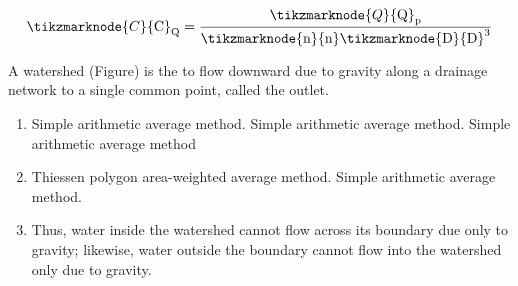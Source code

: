 \bigskip

\begin{equation}
\label{ch05:eqn5.9}
\tikzmarknode{C}{\mathrm{C}}_\mathrm{Q} = \frac{\tikzmarknode{Q}{\mathrm{Q}}_\mathrm{p}}{\mathrm{\tikzmarknode{n}{\mathrm{n}}\tikzmarknode{D}{D}}^3}
\end{equation}

\bigskip\smallskip

A watershed (Figure) is the to flow downward due to gravity along a drainage network
to a single common point, called the outlet.

\begin{enumerate}[(3)]
\item[(1)] Simple arithmetic average method. Simple arithmetic average method. Simple arithmetic average method

\item[(2)] Thiessen polygon area-weighted average method. Simple arithmetic average method.

\item[(3)] Thus, water inside the watershed cannot flow across its boundary due only to gravity; likewise, water outside the boundary cannot flow into the
watershed only due to gravity.
\end{enumerate}

\lipsum[5]



\lipsum[5]

